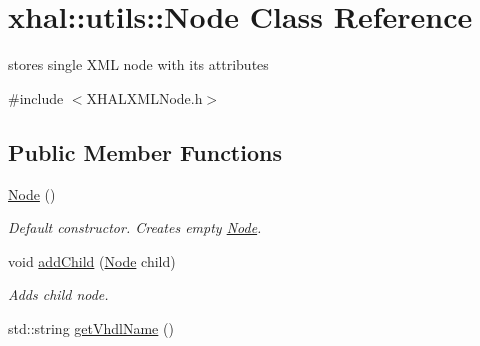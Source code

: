 \hypertarget{classxhal_1_1utils_1_1Node}{
\section{xhal::utils::Node Class Reference}
\label{classxhal_1_1utils_1_1Node}
}


stores single XML node with its attributes  


{\ttfamily \#include $<$XHALXMLNode.h$>$}\subsection*{Public Member Functions}
\begin{DoxyCompactItemize}
\item 
\hypertarget{classxhal_1_1utils_1_1Node_a8a524eb5eeb1d65f9f2939bde3eb764b}{
\hyperlink{classxhal_1_1utils_1_1Node_a8a524eb5eeb1d65f9f2939bde3eb764b}{Node} ()}
\label{classxhal_1_1utils_1_1Node_a8a524eb5eeb1d65f9f2939bde3eb764b}

\begin{DoxyCompactList}\small\item\em Default constructor. Creates empty \hyperlink{classxhal_1_1utils_1_1Node}{Node}. \item\end{DoxyCompactList}\item 
\hypertarget{classxhal_1_1utils_1_1Node_a464f7cbfdb81147813b9232b30a00bc9}{
void \hyperlink{classxhal_1_1utils_1_1Node_a464f7cbfdb81147813b9232b30a00bc9}{addChild} (\hyperlink{classxhal_1_1utils_1_1Node}{Node} child)}
\label{classxhal_1_1utils_1_1Node_a464f7cbfdb81147813b9232b30a00bc9}

\begin{DoxyCompactList}\small\item\em Adds child node. \item\end{DoxyCompactList}\item 
\hypertarget{classxhal_1_1utils_1_1Node_acf2881831d4c490ab0cf92e6bcb6e9a5}{
std::string \hyperlink{classxhal_1_1utils_1_1Node_acf2881831d4c490ab0cf92e6bcb6e9a5}{getVhdlName} ()}
\label{classxhal_1_1utils_1_1Node_acf2881831d4c490ab0cf92e6bcb6e9a5}


\end{DoxyCompactItemize}
